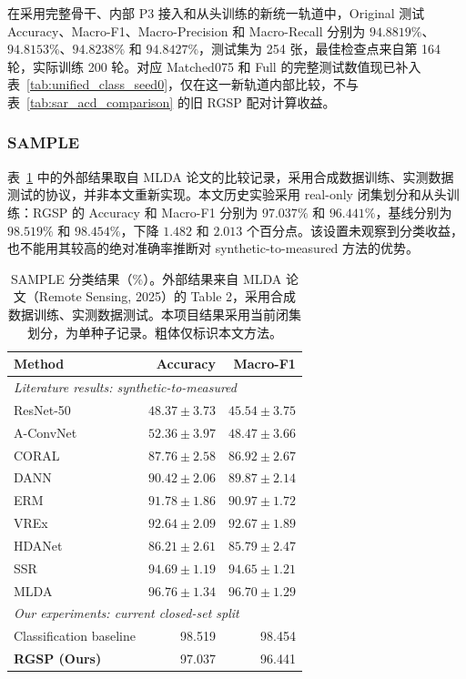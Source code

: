 \documentclass[journal]{IEEEtran}
\begin{document}
在采用完整骨干、内部 P3 接入和从头训练的新统一轨道中，Original 测试 Accuracy、Macro-F1、Macro-Precision 和 Macro-Recall 分别为 $94.8819\%$、$94.8153\%$、$94.8238\%$ 和 $94.8427\%$，测试集为 254 张，最佳检查点来自第 164 轮，实际训练 200 轮。对应 Matched075 和 Full 的完整测试数值现已补入表~\ref{tab:unified_class_seed0}，仅在这一新轨道内部比较，不与表~\ref{tab:sar_acd_comparison} 的旧 RGSP 配对计算收益。

\subsubsection{SAMPLE}
\label{sec:sample_results}

表~\ref{tab:sample_comparison} 中的外部结果取自 MLDA 论文的比较记录，采用合成数据训练、实测数据测试的协议，并非本文重新实现。本文历史实验采用 real-only 闭集划分和从头训练：RGSP 的 Accuracy 和 Macro-F1 分别为 $97.037\%$ 和 $96.441\%$，基线分别为 $98.519\%$ 和 $98.454\%$，下降 $1.482$ 和 $2.013$ 个百分点。该设置未观察到分类收益，也不能用其较高的绝对准确率推断对 synthetic-to-measured 方法的优势。

\begin{table}[!t]
\centering
\small
\setlength{\tabcolsep}{5pt}
\caption{SAMPLE 分类结果（\%）。外部结果来自 MLDA 论文（Remote Sensing, 2025）的 Table 2，采用合成数据训练、实测数据测试。本项目结果采用当前闭集划分，为单种子记录。粗体仅标识本文方法。}
\label{tab:sample_comparison}
\begin{tabular}{lrr}
\toprule
Method & Accuracy & Macro-F1 \\
\midrule
\multicolumn{3}{l}{\textit{Literature results: synthetic-to-measured}} \\
ResNet-50 & $48.37\pm3.73$ & $45.54\pm3.75$ \\
A-ConvNet & $52.36\pm3.97$ & $48.47\pm3.66$ \\
CORAL     & $87.76\pm2.58$ & $86.92\pm2.67$ \\
DANN      & $90.42\pm2.06$ & $89.87\pm2.14$ \\
ERM       & $91.78\pm1.86$ & $90.97\pm1.72$ \\
VREx      & $92.64\pm2.09$ & $92.67\pm1.89$ \\
HDANet    & $86.21\pm2.61$ & $85.79\pm2.47$ \\
SSR       & $94.69\pm1.19$ & $94.65\pm1.21$ \\
MLDA      & $96.76\pm1.34$ & $96.70\pm1.29$ \\
\midrule
\multicolumn{3}{l}{\textit{Our experiments: current closed-set split}} \\
Classification baseline & 98.519 & 98.454 \\
\textbf{RGSP (Ours)}      & 97.037 & 96.441 \\
\bottomrule
\end{tabular}
\end{table}
\end{document}

